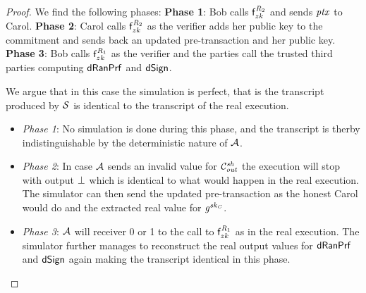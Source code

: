 \begin{proof}
    We find the following phases:
    \textbf{Phase 1}: Bob calls $\mathsf{f}^{\mathit{R}_2}_{zk}$ and sends $\mathit{ptx}$ to Carol.
    \textbf{Phase 2}: Carol calls $\mathsf{f}^{\mathit{R}_2}_{zk}$ as the verifier adds her public key to the commitment and sends back an updated pre-transaction and her public key.
    \textbf{Phase 3}: Bob calls $\mathsf{f}^{\mathit{R}_1}_{zk}$ as the verifier and the parties call the trusted third parties computing $\mathsf{dRanPrf}$ and $\mathsf{dSign}$.

    We argue that in this case the simulation is perfect, that is the transcript produced by $\mathcal{S}$ is identical to the transcript of the real execution.
    \begin{itemize}
        \item \textit{Phase 1}: No simulation is done during this phase, and the transcript is therby indistinguishable by the deterministic nature of $\mathcal{A}$.
        \item \textit{Phase 2}: In case $\mathcal{A}$ sends an invalid value for $\mathcal{C}_{\mathit{out}}^{\mathit{sh}}$ the execution will stop with output $\bot$ which is identical to what would happen in the real execution.
        The simulator can then send the updated pre-transaction as the honest Carol would do and the extracted real value for $\mathit{g}^{\mathit{sk}_{\mathit{C}}}$.
        \item \textit{Phase 3}: $\mathcal{A}$ will receiver 0 or 1 to the call to $\mathsf{f}^{\mathit{R}_1}_{zk}$ as in the real execution.
        The simulator further manages to reconstruct the real output values for $\mathsf{dRanPrf}$ and $\mathsf{dSign}$ again making the transcript identical in this phase.
    \end{itemize}


\end{proof}
